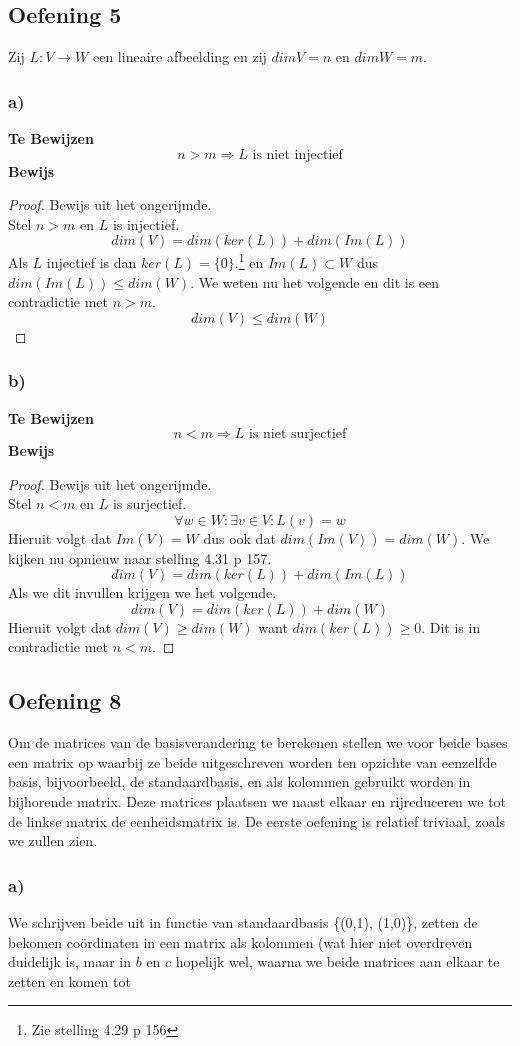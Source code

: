 \documentclass[lineaire_algebra_oplossingen.tex]{subfiles}
\begin{document}
\subsection{Oefening 5}
Zij $L:V \rightarrow W$ een lineaire afbeelding en zij $dim V = n$ en $dim W = m$.\\
\subsubsection*{a)}
\textbf{Te Bewijzen}
\[
n > m \Rightarrow L \text{ is niet injectief}
\]
\textbf{Bewijs}
\begin{proof}
Bewijs uit het ongerijmde.\\
Stel $n>m$ en $L$ is injectief.
\[
dim(V) = dim(ker(L)) + dim(Im(L))
\]
Als $L$ injectief is dan $ker(L)=\{0\}$.\footnote{Zie stelling 4.29 p 156} en $Im(L) \subset W$ dus $dim(Im(L))\le dim(W)$. We weten nu het volgende en dit is een contradictie met $n>m$.
\[
dim(V) \le dim(W)
\]
\end{proof}
\subsubsection*{b)}
\textbf{Te Bewijzen}
\[
n < m \Rightarrow L \text{ is niet surjectief}
\]
\textbf{Bewijs}
\begin{proof}
Bewijs uit het ongerijmde.\\
Stel $n<m$ en $L$ is surjectief.
\[
\forall w\in W:\exists v\in V: L(v)=w
\]
Hieruit volgt dat $Im(V)=W$ dus ook dat $dim(Im(V))=dim(W)$.
We kijken nu opnieuw naar stelling 4.31 p 157.
\[
dim(V) = dim(ker(L)) + dim(Im(L))
\]
Als we dit invullen krijgen we het volgende.
\[
dim(V) = dim(ker(L)) + dim(W)
\]
Hieruit volgt dat $dim(V) \ge dim(W)$ want $dim(ker(L)) \ge 0$. Dit is in contradictie met $n<m$.
\end{proof}

\subsection{Oefening 8}
Om de matrices van de basisverandering te berekenen stellen we voor beide bases een matrix op waarbij ze beide uitgeschreven worden ten opzichte van eenzelfde basis, bijvoorbeeld, de standaardbasis, en als kolommen gebruikt worden in bijhorende matrix. Deze matrices plaatsen we naast elkaar en rijreduceren we tot de linkse matrix de eenheidsmatrix is. De eerste oefening is relatief triviaal, zoals we zullen zien.
\subsubsection*{a)}
We schrijven beide uit in functie van standaardbasis \{(0,1), (1,0)\}, zetten de bekomen co\"ordinaten in een matrix als kolommen (wat hier niet overdreven duidelijk is, maar in $b$ en $c$ hopelijk wel, waarna we beide matrices aan elkaar te zetten en komen tot
\end{document}
